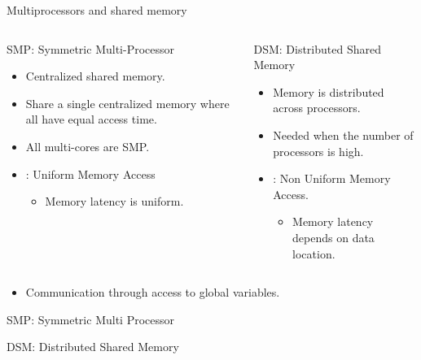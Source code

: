 \begin{frame}[t,shrink=10]{Multiprocessors and shared memory}

\begin{columns}


\begin{block}{SMP: Symmetric Multi-Processor}
\begin{itemize}
  \item Centralized shared memory.
  \item Share a single centralized memory where all have equal access time.
  \item All multi-cores are SMP.
  \item {}: Uniform Memory Access
    \begin{itemize}
      \item Memory latency is uniform.
    \end{itemize}
\end{itemize}
\end{block}

\pause
{}

\begin{block}{DSM: Distributed Shared Memory}
\begin{itemize}
  \item Memory is distributed across processors.
  \item Needed when the number of processors is high.
  \item {}: Non Uniform Memory Access.
    \begin{itemize}
      \item Memory latency depends on data location.
    \end{itemize}
\end{itemize}
\end{block}

\end{columns}


\begin{itemize}
  \item Communication through access to global variables.
\end{itemize}
\end{frame}

\begin{frame}[t]{SMP: Symmetric Multi Processor}
\makebox[\textwidth][c]{}
\end{frame}

\begin{frame}[t]{DSM: Distributed Shared Memory}
\makebox[\textwidth][c]{}
\end{frame}
